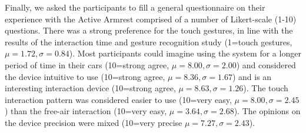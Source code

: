 Finally, we asked the participants to fill a general questionnaire on their experience with the Active Armrest comprised of a number of Likert-scale (1-10) questions. There was a strong preference for the touch gestures, in line with the results of the interaction time and gesture recognition study (1=touch gestures, $\mu=1.72, \sigma=0.84$). Most participants could imagine using the system for a longer period of time in their cars (10=strong agree, $\mu=8.00, \sigma=2.00$) and considered the device intuitive to use (10=strong agree, $\mu=8.36, \sigma=1.67$) and is an interesting interaction device (10=strong agree, $\mu=8.63, \sigma=1.26$). The touch interaction pattern was considered easier to use (10=very easy, $\mu=8.00, \sigma=2.45$) than the free-air interaction (10=very easy, $\mu=3.64, \sigma=2.68$). The opinions on the device precision were mixed (10=very precise $\mu=7.27, \sigma=2.43$).

